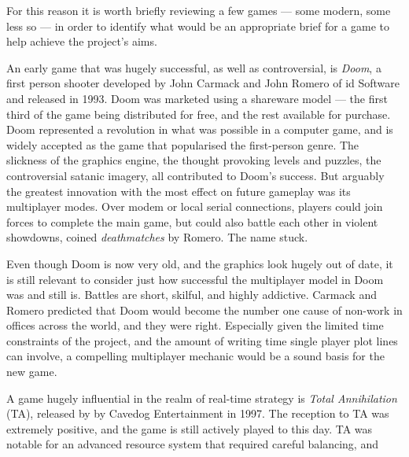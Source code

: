 For this reason it is worth briefly reviewing a few games --- some modern, some less so --- in order to identify what would be an appropriate brief for a game to help achieve the project's aims.

An early game that was hugely successful, as well as controversial, is \emph{Doom}, a first person shooter developed by John Carmack and John Romero of id Software and released in 1993. Doom was marketed using a shareware model --- the first third of the game being distributed for free, and the rest available for purchase. Doom represented a revolution in what was possible in a computer game, and is widely accepted as the game that popularised the first-person genre. The slickness of the graphics engine, the thought provoking levels and puzzles, the controversial satanic imagery, all contributed to Doom's success. But arguably the greatest innovation with the most effect on future gameplay was its multiplayer modes. Over modem or local serial connections, players could join forces to complete the main game, but could also battle each other in violent showdowns, coined \emph{deathmatches} by Romero. The name stuck.

Even though Doom is now very old, and the graphics look hugely out of date, it is still relevant to consider just how successful the multiplayer model in Doom was and still is. Battles are short, skilful, and highly addictive. Carmack and Romero predicted that Doom would become the number one cause of non-work in offices across the world, and they were right. Especially given the limited time constraints of the project, and the amount of writing time single player plot lines can involve, a compelling multiplayer mechanic would be a sound basis for the new game.

A game hugely influential in the realm of real-time strategy is \emph{Total Annihilation} (TA), released by by Cavedog Entertainment in 1997. The reception to TA was extremely positive, and the game is still actively played to this day. TA was notable for an advanced resource system that required careful balancing, and 



